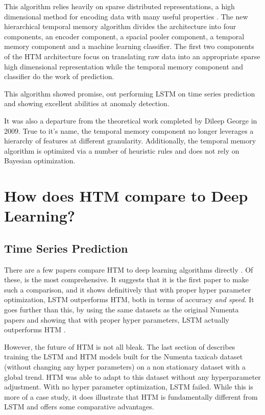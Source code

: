 \documentclass{article}
\begin{document}
This algorithm relies heavily on sparse distributed representations, a high dimensional method for encoding data with many useful properties \cite{Kanerva1988}. The new hierarchical temporal memory algorithm divides the architecture into four components, an encoder component, a spacial pooler component, a temporal memory component and a machine learning classifier. The first two components of the HTM architecture focus on translating raw data into an appropriate sparse high dimensional representation while the temporal memory component and classifier do the work of prediction.

This algorithm showed promise, out performing LSTM on time series prediction and showing excellent abilities at anomaly detection.

It was also a departure from the theoretical work completed by Dileep George in 2009. True to it's name, the temporal memory component no longer leverages a hierarchy of features at different granularity. Additionally, the temporal memory algorithm is optimized via a number of heuristic rules and does not rely on Bayesian optimization. 

\section*{How does HTM compare to Deep Learning?}

\subsection*{Time Series Prediction}
There are a few papers compare HTM to deep learning algorithms directly \cite{Struye2020, Mackenzie2019, Cui2016, Cui2016b}. Of these, \cite{Struye2020} is the most comprehensive. It suggests that it is the first paper to make such a comparison, and it shows definitively that with proper hyper parameter optimization, LSTM outperforms HTM, both in terms of accuracy \textit{and speed}. It goes further than this, by using the same datasets as the original Numenta papers and showing that with proper hyper parameters, LSTM actually outperforms HTM \cite{Cui2016, Cui2016b}.

However, the future of HTM is not all bleak. The last section of \cite{Struye2020} describes training the LSTM and HTM models built for the Numenta taxicab dataset (without changing any hyper parameters) on a non stationary dataset with a global trend. HTM was able to adapt to this dataset without any hyperparameter adjustment. With no hyper parameter optimization, LSTM failed. While this is more of a case study, it does illustrate that HTM is fundamentally different from LSTM and offers some comparative advantages.
\end{document}
